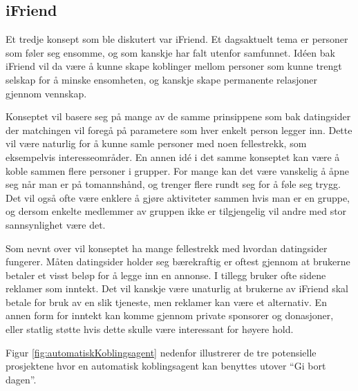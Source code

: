 \subsection{iFriend}
\label{sec:iFriend}
Et tredje konsept som ble diskutert var iFriend. Et dagsaktuelt tema er personer som føler seg ensomme, og som kanskje har falt utenfor samfunnet. Idéen bak iFriend vil da være å kunne skape koblinger mellom personer som kunne trengt selskap for å minske ensomheten, og kanskje skape permanente relasjoner gjennom vennskap.

Konseptet vil basere seg på mange av de samme prinsippene som bak datingsider der matchingen vil foregå på parametere som hver enkelt person legger inn. Dette vil være naturlig for å kunne samle personer med noen fellestrekk, som eksempelvis interesseområder. En annen idé i det samme konseptet kan være å koble sammen flere personer i grupper. For mange kan det være vanskelig å åpne seg når man er på tomannshånd, og trenger flere rundt seg for å føle seg trygg. Det vil også ofte være enklere å gjøre aktiviteter sammen hvis man er en gruppe, og dersom enkelte medlemmer av gruppen ikke er tilgjengelig vil andre med stor sannsynlighet være det.

Som nevnt over vil konseptet ha mange fellestrekk med hvordan datingsider fungerer. Måten datingsider holder seg bærekraftig er oftest gjennom at brukerne betaler et visst beløp for å legge inn en annonse. I tillegg bruker ofte sidene reklamer som inntekt. Det vil kanskje være unaturlig at brukerne av iFriend skal betale for bruk av en slik tjeneste, men reklamer kan være et alternativ. En annen form for inntekt kan komme gjennom private sponsorer og donasjoner, eller statlig støtte hvis dette skulle være interessant for høyere hold.

Figur \ref{fig:automatiskKoblingsagent} nedenfor illustrerer de tre potensielle prosjektene hvor en automatisk koblingsagent kan benyttes utover “Gi bort dagen”.

